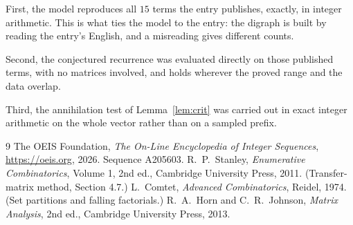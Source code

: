 \documentclass[11pt,a4paper]{article}
\theoremstyle{plain}
\theoremstyle{definition}
\begin{document}
First, the model reproduces all $15$ terms the entry publishes, exactly, in integer
arithmetic. This is what ties the model to the entry: the digraph is built by reading the
entry's English, and a misreading gives different counts.

Second, the conjectured recurrence was evaluated directly on those published terms, with no
matrices involved, and holds wherever the proved range and the data overlap.

Third, the annihilation test of Lemma~\ref{lem:crit} was carried out in exact integer
arithmetic on the whole vector rather than on a sampled prefix.

\begin{thebibliography}{9}
 The OEIS Foundation, \emph{The On-Line Encyclopedia of Integer
Sequences}, \url{https://oeis.org}, 2026. Sequence A205603.
 R.~P.~Stanley, \emph{Enumerative Combinatorics}, Volume 1, 2nd ed.,
Cambridge University Press, 2011. (Transfer-matrix method, Section 4.7.)
 L.~Comtet, \emph{Advanced Combinatorics}, Reidel, 1974. (Set partitions
and falling factorials.)
 R.~A.~Horn and C.~R.~Johnson, \emph{Matrix Analysis}, 2nd ed., Cambridge
University Press, 2013.
\end{thebibliography}
\end{document}
